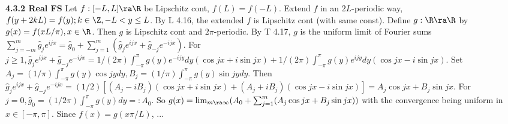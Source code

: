 {\bf 4.3.2 Real FS} Let $f: [-L,L]\ra \R$ be Lipschitz cont, $f(L)=f(-L)$. Extend $f$ in an $2L$-periodic way, $f(y+2kL)=f(y); k\in \Z, -L<y \leq L$. By L 4.16, the extended $f$ is Lipschitz cont (with same const). Define $g: \R \ra \R$ by $g(x)=f(xL/\pi), x \in \R$. Then $g$ is Lipschitz cont and $2\pi$-periodic.  By T 4.17, $g$ is the uniform limit of Fourier sums $\sum_{j=-m}^m \hat{g}_je^{ijx}=\hat{g}_0+\sum_{j=1}^m (\hat{g}_je^{ijx}+\hat{g}_{-j}e^{-ijx})$. For $j \geq 1, \hat{g}_je^{ijx}+\hat{g}_{-j}e^{-ijx}=1/(2\pi)\int_{-\pi}^{\pi}g(y)e^{-ijy}dy(\cos jx+i \sin jx)+ 1/(2\pi) \int_{-\pi}^{\pi} g(y)e^{ijy}dy(\cos jx-i \sin jx)$. Set $A_j=(1/\pi)\int_{-\pi}^{\pi}g(y)\cos jy dy, B_j = (1/\pi) \int_{-\pi}^{\pi} g(y)\sin jy dy$. Then $ \hat{g}_je^{ijx}+\hat{g}_{-j}e^{-ijx}=(1/2)[(A_j-iB_j)(\cos jx + i \sin jx)+(A_j+iB_j)(\cos jx - i\sin jx)]=A_j\cos jx + B_j \sin jx$. For $j=0, \hat{g}_0=(1/2\pi)\int_{-\pi}^{\pi}g(y)dy=:A_0$. So $g(x)= \lim_{m\ra \infty}(A_0+\sum_{j=1}^m(A_j\cos jx + B_j \sin jx))$ with the convergence being uniform in $x \in [-\pi,\pi]$. Since $f(x)=g(x\pi/L)$, ...